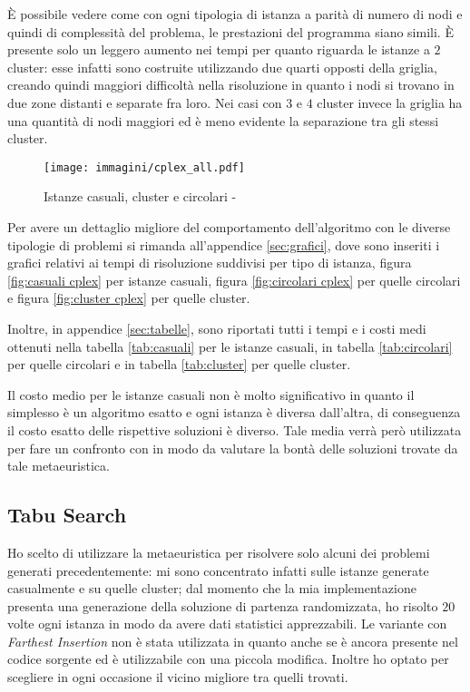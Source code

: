 È possibile vedere come con ogni tipologia di istanza a parità di numero di nodi e quindi di complessità del problema, le prestazioni del programma siano simili.
È presente solo un leggero aumento nei tempi per quanto riguarda le istanze a $2$ cluster: esse infatti sono costruite utilizzando due quarti opposti della griglia, creando quindi maggiori difficoltà nella risoluzione in quanto i nodi si trovano in due zone distanti e separate fra loro.
Nei casi con $3$ e $4$ cluster invece la griglia ha una quantità di nodi maggiori ed è meno evidente la separazione tra gli stessi cluster.

\begin{figure}[H]
	\centering
	\texttt{[image: immagini/cplex\_all.pdf]}
	\caption{Istanze casuali, cluster e circolari - }
	\label{fig:all cplex}
\end{figure}

Per avere un dettaglio migliore del comportamento dell'algoritmo con le diverse tipologie di problemi si rimanda all'appendice \ref{sec:grafici}, dove sono inseriti i grafici relativi ai tempi di risoluzione suddivisi per tipo di istanza, figura \ref{fig:casuali cplex} per istanze casuali, figura \ref{fig:circolari cplex} per quelle circolari e figura \ref{fig:cluster cplex} per quelle cluster.

Inoltre, in appendice \ref{sec:tabelle}, sono riportati tutti i tempi e i costi medi ottenuti nella tabella \ref{tab:casuali} per le istanze casuali, in tabella \ref{tab:circolari} per quelle circolari e in tabella \ref{tab:cluster} per quelle cluster.

Il costo medio per le istanze casuali non è molto significativo in quanto il simplesso è un algoritmo esatto e ogni istanza è diversa dall'altra, di conseguenza il costo esatto delle rispettive soluzioni è diverso.
Tale media verrà però utilizzata per fare un confronto con \tabu in modo da valutare la bontà delle soluzioni trovate da tale metaeuristica.


\subsection{Tabu Search}

Ho scelto di utilizzare la metaeuristica \tabu per risolvere solo alcuni dei problemi generati precedentemente: mi sono concentrato infatti sulle istanze generate casualmente e su quelle cluster; dal momento che la mia implementazione presenta una generazione della soluzione di partenza randomizzata, ho risolto $20$ volte ogni istanza in modo da avere dati statistici apprezzabili.
Le variante con \emph{Farthest Insertion} non è stata utilizzata in quanto anche se è ancora presente nel codice sorgente ed è utilizzabile con una piccola modifica.
Inoltre ho optato per scegliere in ogni occasione il vicino migliore tra quelli trovati.

